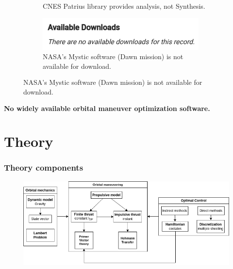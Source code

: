 \documentclass{beamer}
\begin{document}
\begin{frame}
\begin{figure}[htbp]
\begin{subfigure}{0.25\textwidth}
            \caption{CNES Patrius library provides analysis, not Synthesis.}
        \end{subfigure} \pause
        \begin{subfigure}{0.25\textwidth}
            \centering
            \includegraphics[width=\textwidth]{img/mystic_no_download.png}
            \caption{NASA's Mystic software (Dawn mission) is not available for download.}
        \end{subfigure}
    \end{figure}
    \pause
    \textbf{No widely available orbital maneuver optimization software.}
\end{frame}

\section{Theory}

\begin{frame}
    \frametitle{Theory components}

    \begin{figure}[htbp]
        \centering
        \includegraphics[width=\textwidth]{img/theory_components.png}
    \end{figure}
\end{frame}
\end{document}
